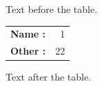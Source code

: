 \documentclass[12pt]{article}
\begin{document}
Text before the table.

\begin{tabular}{>{\bfseries}l<{:}r}Name & 1\\Other & 22\end{tabular}

Text after the table.
\end{document}
